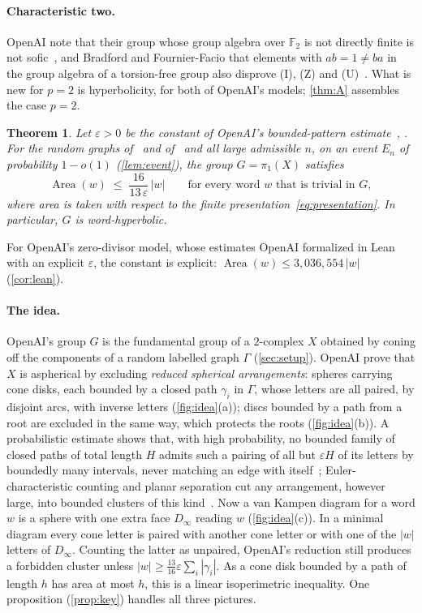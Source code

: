 \documentclass[11pt]{article}
\newtheorem{theorem}{Theorem}
\theoremstyle{definition}
\theoremstyle{plain}
\newcommand{\F}{\mathbb{F}}
\newcommand{\eps}{\varepsilon}
\newcommand{\Area}{\operatorname{Area}}
\begin{document}
\paragraph{Characteristic two.} OpenAI note that their group whose group algebra over $\F_2$ is not directly finite is not sofic~\cite[\S1]{OAI197a}, and Bradford and Fournier-Facio that elements with $ab=1\neq ba$ in the group algebra of a torsion-free group also disprove (I), (Z) and (U)~\cite[\S1]{BFF2024}. What is new for $p=2$ is hyperbolicity, for both of OpenAI's models; \cref{thm:A} assembles the case $p=2$.

\begin{tcolorbox}[headline]
\begin{theorem}\label{thm:B}
Let $\eps>0$ be the constant of OpenAI's bounded-pattern estimate~\cite[Prop.~3.1]{OAI196}, \cite[Thm.~4.1]{OAI197a}. For the random graphs of~\cite{OAI196} and of~\cite{OAI197a} and all large admissible $n$, on an event $E_n$ of probability $1-o(1)$ \textup{(\cref{lem:event})}, the group $G=\pi_1(X)$ satisfies
\[
\Area(w)\;\le\;\frac{16}{13\,\eps}\,|w|\qquad\text{for every word $w$ that is trivial in $G$},
\]
where area is taken with respect to the finite presentation~\eqref{eq:presentation}. In particular, $G$ is word-hyperbolic.
\end{theorem}
\end{tcolorbox}

\noindent For OpenAI's zero-divisor model, whose estimates OpenAI formalized in Lean with an explicit $\eps$, the constant is explicit: $\Area(w)\le 3{,}036{,}554\,|w|$ (\cref{cor:lean}).

\paragraph{The idea.} OpenAI's group $G$ is the fundamental group of a $2$-complex $X$ obtained by coning off the components of a random labelled graph $\Gamma$ (\cref{sec:setup}). OpenAI prove that $X$ is aspherical by excluding \emph{reduced spherical arrangements}: spheres carrying cone disks, each bounded by a closed path $\gamma_i$ in $\Gamma$, whose letters are all paired, by disjoint arcs, with inverse letters (\cref{fig:idea}(a)); discs bounded by a path from a root are excluded in the same way, which protects the roots (\cref{fig:idea}(b)). A probabilistic estimate shows that, with high probability, no bounded family of closed paths of total length $H$ admits such a pairing of all but $\eps H$ of its letters by boundedly many intervals, never matching an edge with itself~\cite[Prop.~3.1]{OAI196}; Euler-characteristic counting and planar separation cut any arrangement, however large, into bounded clusters of this kind~\cite[\S4]{OAI196}. Now a van Kampen diagram for a word $w$ is a sphere with one extra face $D_\infty$ reading $w$ (\cref{fig:idea}(c)). In a minimal diagram every cone letter is paired with another cone letter or with one of the $|w|$ letters of $D_\infty$. Counting the latter as unpaired, OpenAI's reduction still produces a forbidden cluster unless $|w|\ge\frac{13}{16}\eps\sum_i|\gamma_i|$. As a cone disk bounded by a path of length $h$ has area at most $h$, this is a linear isoperimetric inequality. One proposition (\cref{prop:key}) handles all three pictures.
\end{document}
